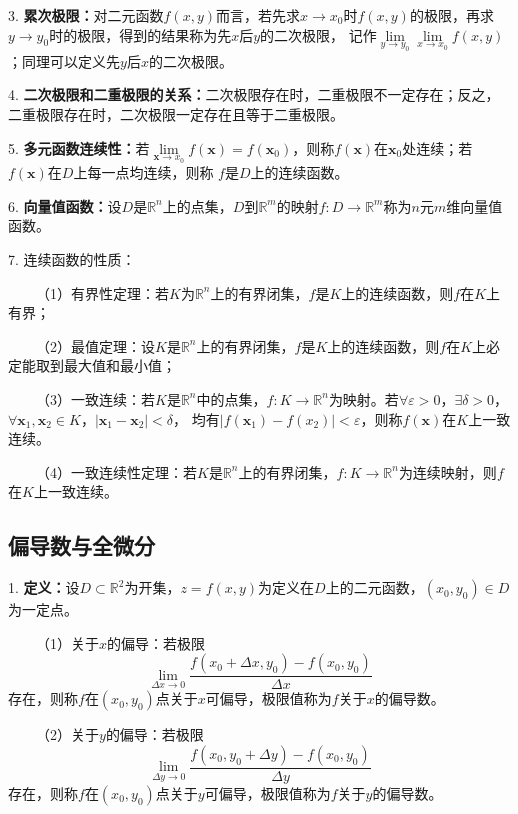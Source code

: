 3. \textbf{累次极限：}对二元函数$f(x,y)$而言，若先求$x\rightarrow x_0$时$f(x,y)$的极限，再求$y\rightarrow y_0$时的极限，得到的结果称为先$x$后$y$的二次极限，
记作$\lim\limits_{y\rightarrow y_0}\lim\limits_{x\rightarrow x_0}f(x,y)$；同理可以定义先$y$后$x$的二次极限。

4. \textbf{二次极限和二重极限的关系：}二次极限存在时，二重极限不一定存在；反之，二重极限存在时，二次极限一定存在且等于二重极限。

5. \textbf{多元函数连续性：}若$\lim\limits_{\boldsymbol{x} \rightarrow x_0}f(\boldsymbol{x})=f(\boldsymbol{x}_0)$，则称$f(\boldsymbol{x})$在$\boldsymbol{x}_0$处连续；若$f(\boldsymbol{x})$在$D$上每一点均连续，则称
$f$是$D$上的连续函数。

6. \textbf{向量值函数：}设$D$是$\mathbb{R}^n$上的点集，$D$到$\mathbb{R}^m$的映射$f:D\rightarrow \mathbb{R}^m$称为$n$元$m$维向量值函数。

7. 连续函数的性质：

~~~~（1）有界性定理：若$K$为$\mathbb{R}^n$上的有界闭集，$f$是$K$上的连续函数，则$f$在$K$上有界；

~~~~（2）最值定理：设$K$是$\mathbb{R}^n$上的有界闭集，$f$是$K$上的连续函数，则$f$在$K$上必定能取到最大值和最小值；

~~~~（3）一致连续：若$K$是$\mathbb{R}^n$中的点集，$f:K\rightarrow \mathbb{R}^n$为映射。若$\forall \varepsilon>0$，$\exists \delta >0$，$\forall \boldsymbol{x}_1,\boldsymbol{x}_2\in K$，$|\boldsymbol{x}_1-\boldsymbol{x}_2|<\delta$，
均有$|f(\boldsymbol{x}_1)-f(x_2)|<\varepsilon$，则称$f(\boldsymbol{x})$在$K$上一致连续。

~~~~（4）一致连续性定理：若$K$是$\mathbb{R}^n$上的有界闭集，$f:K\rightarrow \mathbb{R}^n$为连续映射，则$f$在$K$上一致连续。

\subsection{偏导数与全微分}

1. \textbf{定义：}设$D\subset \mathbb{R}^2$为开集，$z=f(x,y)$为定义在$D$上的二元函数，$\left(x_0,y_0\right)\in D$为一定点。

~~~~（1）关于$x$的偏导：若极限
\begin{equation*}
    \lim\limits_{\Delta x\rightarrow 0}\frac{f(x_0+\Delta x,y_0)-f(x_0,y_0)}{\Delta x}
\end{equation*}
存在，则称$f$在$(x_0,y_0)$点关于$x$可偏导，极限值称为$f$关于$x$的偏导数。

~~~~（2）关于$y$的偏导：若极限
\begin{equation*}
    \lim\limits_{\Delta y\rightarrow 0}\frac{f(x_0,y_0+\Delta y)-f(x_0,y_0)}{\Delta y}
\end{equation*}
存在，则称$f$在$(x_0,y_0)$点关于$y$可偏导，极限值称为$f$关于$y$的偏导数。

